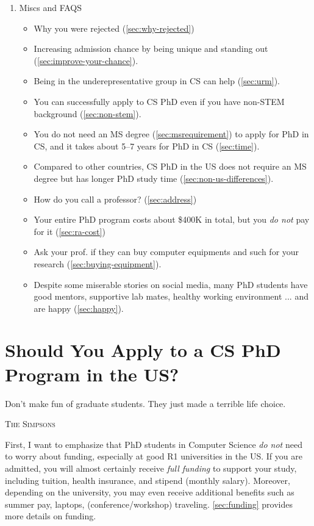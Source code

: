 \documentclass[oneside,11pt]{book}
\begin{document}
\begin{enumerate}
    \item Miscs and FAQS
        \begin{itemize}
          \item Why you were rejected (\autoref{sec:why-rejected})
          \item Increasing admission chance by being unique and standing out (\autoref{sec:improve-your-chance}).
          \item Being in the underepresentative group in CS can help (\autoref{sec:urm}).
          \item You can successfully apply to CS PhD even if you have non-STEM background (\autoref{sec:non-stem}).
          \item You do not need an MS degree (\autoref{sec:msrequirement}) to apply for PhD in CS, and it takes about 5--7 years for PhD in CS (\autoref{sec:time}).
          \item Compared to other countries, CS PhD in the US does not require an MS degree but has longer PhD study time (\autoref{sec:non-us-differences}).
          \item How do you call a professor? (\autoref{sec:address})
          \item Your entire PhD program costs about \$400K in total, but you \emph{do not} pay for it (\autoref{sec:ra-cost})
          \item Ask your prof. if they can buy computer equipments and such for your research (\autoref{sec:buying-equipment}).
          \item Despite some miserable stories on social media, many PhD students have good mentors, supportive lab mates, healthy working environment ... and are happy (\autoref{sec:happy}).
        \end{itemize}
\end{enumerate}


\mainmatter
\chapter{Should You Apply to a CS PhD Program in the US?}\label{sec:should}

\epigraph{\vspace{-0.2in} Don't make fun of graduate students. They just made a terrible life choice.}{\textsc{The Simpsons}}

First, I want to emphasize that PhD students in Computer Science \emph{do not} need to worry about funding, especially at good R1
universities in the US. If you are admitted, you will almost certainly
receive \emph{full funding} to support your study, including tuition,
health insurance, and stipend (monthly salary). Moreover, depending on the university,
you may even receive additional benefits such as summer pay, laptops, (conference/workshop) traveling. \autoref{sec:funding} provides more details on funding.
\end{document}
